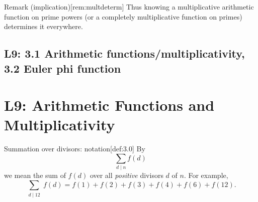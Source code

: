 \documentclass[10pt]{article}
\theoremstyle{definition}
\theoremstyle{plain}
\numberwithin{equation}{section}
\begin{document}
\begin{define}{Remark (implication)}[rem:multdeterm]
Thus knowing a multiplicative arithmetic function on prime powers (or a completely multiplicative
function on primes) determines it everywhere.
\end{define}
























\newpage
\subsection{L9: 3.1 Arithmetic functions/multiplicativity, 3.2 Euler phi function}

\section*{L9: Arithmetic Functions and Multiplicativity}

\begin{define}{Summation over divisors: notation}[def:3.0]
By
\[
\sum_{d\mid n} f(d)
\]
we mean the sum of $f(d)$ over all \emph{positive} divisors $d$ of $n$. For example,
\[
\sum_{\substack{d\mid 12}} f(d)=f(1)+f(2)+f(3)+f(4)+f(6)+f(12).
\]
\end{define}
\end{document}
